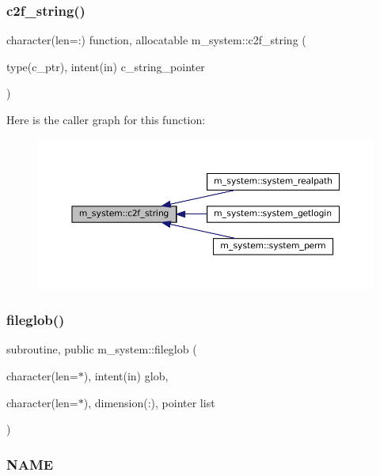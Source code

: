\subsubsection{\texorpdfstring{c2f\+\_\+string()}{c2f\_string()}}
{\footnotesize\ttfamily character(len=\+:) function, allocatable m\+\_\+system\+::c2f\+\_\+string (\begin{DoxyParamCaption}\item[{type(c\+\_\+ptr), intent(in)}]{c\+\_\+string\+\_\+pointer }\end{DoxyParamCaption})\hspace{0.3cm}{\ttfamily [private]}}

Here is the caller graph for this function\+:
\nopagebreak
\begin{figure}[H]
\begin{center}
\leavevmode
\includegraphics[width=350pt]{namespacem__system_aa7c5445619aa15cd2301fe17f7c3b73c_icgraph}
\end{center}
\end{figure}
\mbox{\label{namespacem__system_a79656f76ad75168302e0d770052e901e}} 
\subsubsection{\texorpdfstring{fileglob()}{fileglob()}}
{\footnotesize\ttfamily subroutine, public m\+\_\+system\+::fileglob (\begin{DoxyParamCaption}\item[{character(len=$\ast$), intent(in)}]{glob,  }\item[{character(len=$\ast$), dimension(\+:), pointer}]{list }\end{DoxyParamCaption})}



\subsubsection*{N\+A\+ME}

